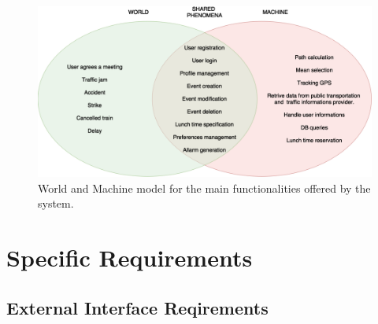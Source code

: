 \documentclass{article}
\begin{document}
	\bigskip
	\bigskip
	\begin{figure}[htbp]
		\begin{center}
		\includegraphics[width=\textwidth]{img/WorldAndMachineModel.png}
		\caption{World and Machine model for the main functionalities offered by the system.}
		\label{default}
		\end{center}
	\end{figure}

	
	\section{Specific Requirements}
	
	
	\subsection{External Interface Reqirements}
	
	
\end{document}
